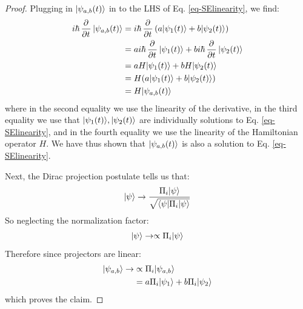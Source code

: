 \begin{proof}
    Plugging in $\lvert \psi_{a, b}(t) \rangle$ in to the LHS of Eq. \eqref{eq-SElinearity}, we find:
    \begin{equation}
        \begin{split}
            i\hbar\dpd{}{t}\ket{\psi_{a, b}(t)} &= i\hbar\dpd{}{t}(a\ket{\psi_1(t)} + b\ket{\psi_2(t)})
            \\ &= ai\hbar\dpd{}{t}\ket{\psi_1(t)} + bi\hbar\dpd{}{t}\ket{\psi_2(t)}
            \\ &= aH\ket{\psi_1(t)} + bH\ket{\psi_2(t)}
            \\ &= H(a\ket{\psi_1(t)} + b\ket{\psi_2(t)})
            \\ &= H\ket{\psi_{a, b}(t)}
        \end{split}
    \end{equation}
    where in the second equality we use the linearity of the derivative, in the third equality we use that $\lvert \psi_1(t) \rangle, \lvert \psi_2(t) \rangle$ are individually solutions to Eq. \eqref{eq-SElinearity}, and in the fourth equality we use the linearity of the Hamiltonian operator $H$. We have thus shown that $\lvert \psi_{a, b}(t) \rangle$ is also a solution to Eq. \eqref{eq-SElinearity}.

    Next, the Dirac projection postulate tells us that:
    \begin{equation}
        \lvert \psi \rangle \to \frac{\Pi_i\lvert \psi \rangle}{\sqrt{\langle \psi \rvert\Pi_i\lvert \psi \rangle}}
    \end{equation}
    So neglecting the normalization factor:
    \begin{equation}
        \lvert \psi \rangle \to \propto \Pi_i \lvert \psi \rangle
    \end{equation}
    Therefore since projectors are linear:
    \begin{equation}
        \begin{split}
            \lvert \psi_{a, b} \rangle \to &\propto\Pi_i\lvert \psi_{a, b} \rangle
            \\ &= a\Pi_i\lvert \psi_1 \rangle + b\Pi_i\lvert \psi_2 \rangle
        \end{split}
    \end{equation}
    which proves the claim.
\end{proof}

